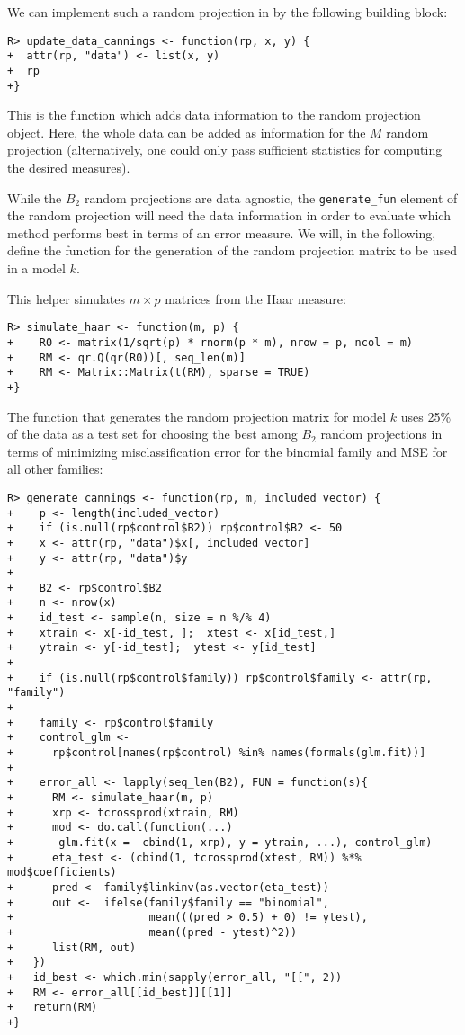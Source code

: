 \documentclass[
  article]{jss}
\begin{document}
We can implement such a random projection in  by the following
building block:

\begin{verbatim}
R> update_data_cannings <- function(rp, x, y) {
+  attr(rp, "data") <- list(x, y)
+  rp
+}
\end{verbatim}

This is the function which adds data information to the random
projection object. Here, the whole data can be added as information for
the \(M\) random projection (alternatively, one could only pass
sufficient statistics for computing the desired measures).

While the \(B_2\) random projections are data agnostic, the
\texttt{generate\_fun} element of the random projection will need the
data information in order to evaluate which method performs best in
terms of an error measure. We will, in the following, define the
function for the generation of the random projection matrix to be used
in a model \(k\).

This helper simulates \(m\times p\) matrices from the Haar measure:

\begin{verbatim}
R> simulate_haar <- function(m, p) {
+    R0 <- matrix(1/sqrt(p) * rnorm(p * m), nrow = p, ncol = m)
+    RM <- qr.Q(qr(R0))[, seq_len(m)]
+    RM <- Matrix::Matrix(t(RM), sparse = TRUE)  
+}
\end{verbatim}

The function that generates the random projection matrix for model \(k\)
uses 25\% of the data as a test set for choosing the best among \(B_2\)
random projections in terms of minimizing misclassification error for
the binomial family and MSE for all other families:

\begin{verbatim}
R> generate_cannings <- function(rp, m, included_vector) {
+    p <- length(included_vector)
+    if (is.null(rp$control$B2)) rp$control$B2 <- 50
+    x <- attr(rp, "data")$x[, included_vector]
+    y <- attr(rp, "data")$y
+  
+    B2 <- rp$control$B2
+    n <- nrow(x)
+    id_test <- sample(n, size = n %/% 4)
+    xtrain <- x[-id_test, ];  xtest <- x[id_test,]
+    ytrain <- y[-id_test];  ytest <- y[id_test]
+  
+    if (is.null(rp$control$family)) rp$control$family <- attr(rp, "family")
+  
+    family <- rp$control$family
+    control_glm <-
+      rp$control[names(rp$control) %in% names(formals(glm.fit))]
+
+    error_all <- lapply(seq_len(B2), FUN = function(s){
+      RM <- simulate_haar(m, p)
+      xrp <- tcrossprod(xtrain, RM)
+      mod <- do.call(function(...) 
+       glm.fit(x =  cbind(1, xrp), y = ytrain, ...), control_glm)
+      eta_test <- (cbind(1, tcrossprod(xtest, RM)) %*% mod$coefficients)
+      pred <- family$linkinv(as.vector(eta_test))
+      out <-  ifelse(family$family == "binomial",
+                     mean(((pred > 0.5) + 0) != ytest), 
+                     mean((pred - ytest)^2))
+      list(RM, out)
+   })
+   id_best <- which.min(sapply(error_all, "[[", 2))
+   RM <- error_all[[id_best]][[1]]
+   return(RM)
+}
\end{verbatim}
\end{document}
